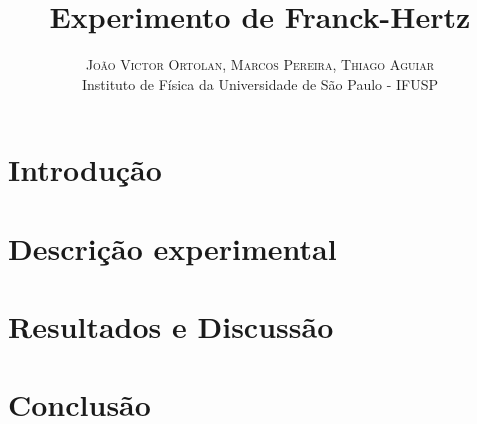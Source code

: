 \documentclass[twoside]{article}
\title{\vspace{-18mm}\fontsize{18pt}{20pt}\selectfont\textbf{Experimento de Franck-Hertz}}
\author{
\large
\textsc{João Victor Ortolan, Marcos Pereira, Thiago Aguiar}\\[2mm]
\large Instituto de Física da Universidade de São Paulo - IFUSP 
}
\date{}
\begin{document}
\maketitle

\thispagestyle{fancy} 
 

\begin{abstract}
    

\end{abstract}
%
\vspace{0.5cm}
\begin{multicols}{2}

\section{Introdução}
\section{Descrição experimental}
\section{Resultados e Discussão}
\section{Conclusão}




\end{multicols}
\end{document}
